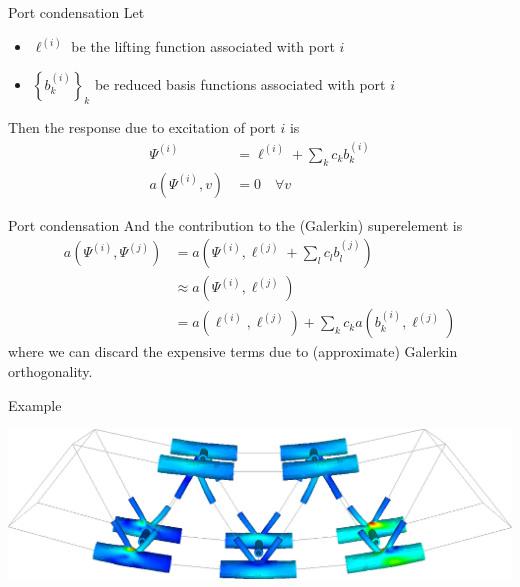 \documentclass{sintefbeamer}
\begin{document}
\begin{frame}{Port condensation}
    Let
    \begin{itemize}
        \item \(\ell^{(i)}\) be the lifting function associated with port \(i\)
        \item \(\left\{b_k^{(i)}\right\}_k\) be reduced basis functions associated with port \(i\)
    \end{itemize}
    Then the response due to excitation of port \(i\) is
    \begin{align*}
        \Psi^{(i)} &= \ell^{(i)} + \sum_k c_k b_k^{(i)} \\
        a(\Psi^{(i)}, v) &= 0 \quad\forall v
    \end{align*}
\end{frame}

\begin{frame}{Port condensation}
    And the contribution to the (Galerkin) superelement is
    \begin{align*}
        a(\Psi^{(i)}, \Psi^{(j)})
        &= a\left(\Psi^{(i)}, \ell^{(j)} + \sum_l c_l b_l^{(j)} \right) \\
        &\approx a\left(\Psi^{(i)}, \ell^{(j)}\right) \\
        &= a\left(\ell^{(i)}, \ell^{(j)}\right) + \sum_k c_k a\left( b_k^{(i)}, \ell^{(j)} \right)
    \end{align*}
    where we can discard the expensive terms due to (approximate) Galerkin orthogonality.
\end{frame}

\begin{frame}{Example}
    \begin{center}
        \includegraphics[width=1.0\textwidth,trim={0 0 0 0},clip]{images/ebridge-after.png}
    \end{center}
\end{frame}
\end{document}
